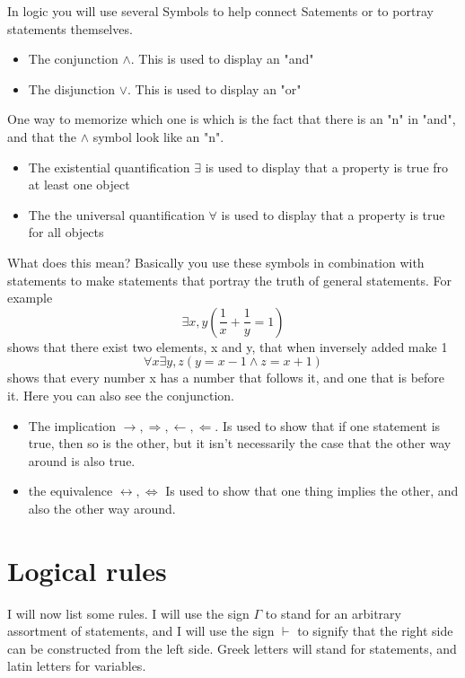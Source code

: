 \documentclass[]{scrbook}
\begin{document}
In logic you will use several Symbols to help connect Satements or to portray statements themselves.
\begin{itemize}
	\item[] The conjunction $\wedge$. This is used to display an "and"
	\item[] The disjunction $\vee$. This is used to display an "or"
\end{itemize}
One way to memorize which one is which is the fact that there is an "n" in "and", and that the $\wedge$ symbol look like an "n".
\begin{itemize}
	\item[] The existential quantification $\exists$ is used to display that a property is true fro at least one object
	\item[] The the universal quantification $\forall$ is used to display that a property is true for all objects
\end{itemize}
What does this mean? Basically you use these symbols in combination with statements to make statements that portray the truth of general statements. For example
\begin{equation}
	\exists x,y\left(\frac{1}{x} + \frac{1}{y} = 1\right) 
\end{equation}
shows that there exist two elements, x and y, that when inversely added make 1
\begin{equation}
	\forall x \exists y, z\left( y = x-1 \wedge z = x + 1\right) 
\end{equation}
shows that every number x has a number that follows it, and one that is before it. Here you can also see the conjunction.
\begin{itemize}
	\item[] The implication $\rightarrow, \Rightarrow, \leftarrow, \Leftarrow$. Is used to show that if one statement is true, then so is the other, but it isn't necessarily the case that the other way around is also true.
	\item[] the equivalence $\leftrightarrow, \Leftrightarrow$ Is used to show that one thing implies the other, and also the other way around.
\end{itemize}
\section{Logical rules}
I will now list some rules. I will use the sign $\Gamma$ to stand for an arbitrary assortment of statements, and I will use the sign $\vdash$ to signify that the right side can be constructed from the left side. Greek letters will stand for statements, and latin letters for variables.
\end{document}
